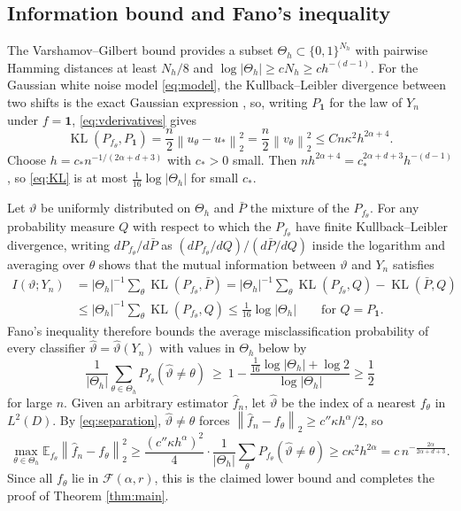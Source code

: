 \documentclass[11pt]{article}
\numberwithin{equation}{section}
\newcommand{\E}{\mathbb E}
\newcommand{\norm}[1]{\left\|#1\right\|}
\newcommand{\KL}{\operatorname{KL}}
\begin{document}
\subsection{Information bound and Fano's inequality}

The Varshamov--Gilbert bound \cite[Lemma 2.9]{Tsybakov} provides a
subset $\Theta_h\subset\{0,1\}^{N_h}$ with pairwise Hamming distances
at least $N_h/8$ and $\log|\Theta_h|\ge cN_h\ge ch^{-(d-1)}$. For the
Gaussian white noise model \eqref{eq:model}, the Kullback--Leibler
divergence between two shifts is the exact Gaussian expression
\cite[equation (6.16)]{GN}, so, writing $P_{\mathbf 1}$ for the law
of $Y_n$ under $f=\mathbf 1$, \eqref{eq:vderivatives} gives
\begin{equation}\label{eq:KL}
 \KL(P_{f_\theta},P_{\mathbf 1})
       =\frac n2\norm{u_\theta-u_*}_2^2
       =\frac n2\norm{v_\theta}_2^2
       \le Cn\kappa^2h^{2\alpha+4}.
\end{equation}
Choose $h=c_*n^{-1/(2\alpha+d+3)}$ with $c_*>0$ small. Then
$nh^{2\alpha+4}=c_*^{2\alpha+d+3}h^{-(d-1)}$, so \eqref{eq:KL} is at
most $\tfrac1{16}\log|\Theta_h|$ for small $c_*$.

Let $\vartheta$ be uniformly distributed on $\Theta_h$ and $\bar P$
the mixture of the $P_{f_\theta}$. For any probability measure $Q$
with respect to which the $P_{f_\theta}$ have finite Kullback--Leibler
divergence, writing $dP_{f_\theta}/d\bar P$ as
$(dP_{f_\theta}/dQ)/(d\bar P/dQ)$ inside the logarithm and averaging
over $\theta$ shows that the mutual information between $\vartheta$
and $Y_n$ satisfies
\begin{align*}
 I(\vartheta;Y_n)
 &=|\Theta_h|^{-1}\textstyle\sum_\theta\KL(P_{f_\theta},\bar P)
 =|\Theta_h|^{-1}\sum_\theta\KL(P_{f_\theta},Q)-\KL(\bar P,Q)\\
 &\le|\Theta_h|^{-1}\textstyle\sum_\theta\KL(P_{f_\theta},Q)
 \le\tfrac1{16}\log|\Theta_h|\qquad\text{for }Q=P_{\mathbf 1}.
\end{align*}
Fano's inequality \cite[Lemma 2.10 and Corollary 2.6]{Tsybakov} therefore
bounds the average misclassification probability of every classifier
$\widehat\vartheta=\widehat\vartheta(Y_n)$ with values in $\Theta_h$
below by
\[
 \frac1{|\Theta_h|}\sum_{\theta\in\Theta_h}
 P_{f_\theta}(\widehat\vartheta\ne\theta)\ \ge\
 1-\frac{\frac1{16}\log|\Theta_h|+\log 2}{\log|\Theta_h|}
 \ge \frac12
\]
for large $n$. Given an arbitrary estimator $\widehat f_n$, let
$\widehat\vartheta$ be the index of a nearest $f_\theta$ in $L^2(D)$.
By \eqref{eq:separation}, $\widehat\vartheta\ne\theta$ forces
$\norm{\widehat f_n-f_\theta}_2\ge c''\kappa h^\alpha/2$, so
\[
 \max_{\theta\in\Theta_h}\E_{f_\theta}\norm{\widehat f_n-f_\theta}_2^2
 \ge\frac{(c''\kappa h^\alpha)^2}4\cdot
 \frac1{|\Theta_h|}\sum_\theta P_{f_\theta}(\widehat\vartheta\ne\theta)
 \ge c\kappa^2h^{2\alpha}=c\,n^{-\frac{2\alpha}{2\alpha+d+3}} .
\]
Since all $f_\theta$ lie in $\mathcal F(\alpha,r)$, this is the claimed
lower bound and completes the proof of Theorem \ref{thm:main}.
\end{document}

